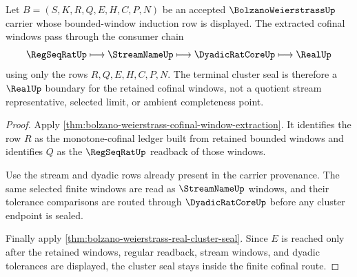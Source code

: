 \begin{theorem}
\label{thm:bolzano-weierstrass-cofinal-cluster-seal}
Let $B=(S,K,R,Q,E,H,C,P,N)$ be an accepted $\BolzanoWeierstrassUp$ carrier whose bounded-window induction row is displayed. The extracted cofinal windows pass through the consumer chain
$$
\RegSeqRatUp \longmapsto \StreamNameUp \longmapsto \DyadicRatCoreUp \longmapsto \RealUp
$$
using only the rows $R,Q,E,H,C,P,N$. The terminal cluster seal is therefore a $\RealUp$ boundary for the retained cofinal windows, not a quotient stream representative, selected limit, or ambient completeness point.
\end{theorem}
\begin{proof}
Apply \autoref{thm:bolzano-weierstrass-cofinal-window-extraction}. It identifies the row $R$ as the monotone-cofinal ledger built from retained bounded windows and identifies $Q$ as the $\RegSeqRatUp$ readback of those windows.

Use the stream and dyadic rows already present in the carrier provenance. The same selected finite windows are read as $\StreamNameUp$ windows, and their tolerance comparisons are routed through $\DyadicRatCoreUp$ before any cluster endpoint is sealed.

Finally apply \autoref{thm:bolzano-weierstrass-real-cluster-seal}. Since $E$ is reached only after the retained windows, regular readback, stream windows, and dyadic tolerances are displayed, the cluster seal stays inside the finite cofinal route.
\end{proof}

